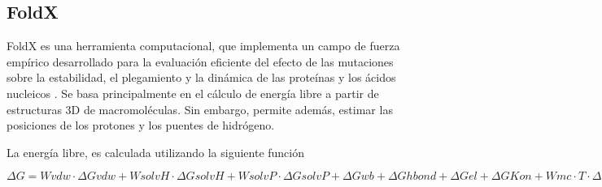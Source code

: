 \subsection{FoldX}

FoldX es una herramienta computacional, que implementa un campo de fuerza empírico desarrollado para la evaluación eficiente del efecto de las mutaciones sobre la estabilidad, el plegamiento y la dinámica de las proteínas y los ácidos nucleicos \cite{Schymkowitz2005}. Se basa principalmente en el cálculo de energía libre a partir de estructuras 3D de macromoléculas. Sin embargo, permite además, estimar las posiciones de los protones y los puentes de hidrógeno. 

La energía libre, es calculada utilizando la siguiente función

$\Delta G=Wvdw \cdot \Delta Gvdw+WsolvH \cdot \Delta GsolvH+WsolvP \cdot \Delta GsolvP+ \Delta Gwb+ \Delta Ghbond+ \Delta Gel+ \Delta GKon+Wmc \cdot T \cdot \Delta Smc+Wsc \cdot T \cdot \Delta Ssc$

